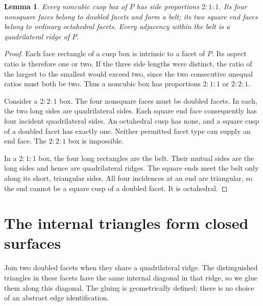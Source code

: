 \documentclass[11pt]{article}
\newtheorem{lemma}[theorem]{Lemma}
\theoremstyle{remark}
\begin{document}
\begin{lemma}\label{lem:box}
Every noncubic cusp box of $P$ has side proportions $2:1:1$.
Its four nonsquare faces belong to doubled facets and form a belt;
its two square end faces belong to ordinary octahedral facets.
Every adjacency within the belt is a quadrilateral ridge of $P$.
\end{lemma}
\begin{proof}
Each face rectangle of a cusp box is intrinsic to a facet of $P$.
Its aspect ratio is therefore one or two. If the three side lengths
were distinct, the ratio of the largest to the smallest would exceed
two, since the two consecutive unequal ratios must both be two.
Thus a noncubic box has proportions $2:1:1$ or $2:2:1$.

Consider a $2:2:1$ box. The four nonsquare faces must be doubled
facets. In each, the two long sides are quadrilateral sides. Each
square end face consequently has four incident quadrilateral sides.
An octahedral cusp has none, and a square cusp of a doubled facet
has exactly one. Neither permitted facet type can supply an end
face. The $2:2:1$ box is impossible.

In a $2:1:1$ box, the four long rectangles are the belt. Their
mutual sides are the long sides and hence are quadrilateral ridges.
The square ends meet the belt only along its short, triangular
sides. All four incidences at an end are triangular, so the end
cannot be a square cusp of a doubled facet. It is octahedral.
\end{proof}

\section{The internal triangles form closed surfaces}

Join two doubled facets when they share a quadrilateral ridge.
The distinguished triangles in these facets have the same internal
diagonal in that ridge, so we glue them along this diagonal. The
gluing is geometrically defined; there is no choice of an abstract
edge identification.
\end{document}
